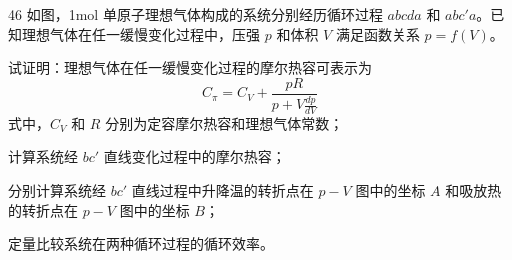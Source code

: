 \begin{problem}[第32届全国中学生物理竞赛复赛][热力学循环过程]{46}
    如图，1mol 单原子理想气体构成的系统分别经历循环过程 $abcda$ 和 $abc'a$。已知理想气体在任一缓慢变化过程中，压强 $p$ 和体积 $V$ 满足函数关系 $p = f(V)$。
    \begin{subproblem}
        试证明：理想气体在任一缓慢变化过程的摩尔热容可表示为
        \begin{equation*}
            C_{\pi} = C_{V} + \frac{pR}{p + V\frac{dp}{dV}}
        \end{equation*}
        式中，$C_{V}$ 和 $R$ 分别为定容摩尔热容和理想气体常数；
    \end{subproblem}
    \begin{subproblem}
        计算系统经 $bc'$ 直线变化过程中的摩尔热容；
    \end{subproblem}
    \begin{subproblem}
        分别计算系统经 $bc'$ 直线过程中升降温的转折点在 $p-V$ 图中的坐标 $A$ 和吸放热的转折点在 $p-V$ 图中的坐标 $B$；
    \end{subproblem}
    \begin{subproblem}
        定量比较系统在两种循环过程的循环效率。
    \end{subproblem}
\end{problem}